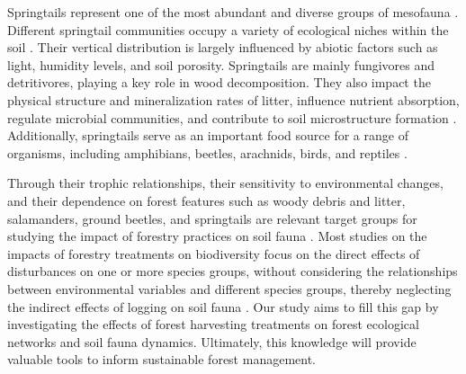 Springtails represent one of the most abundant and diverse groups of mesofauna \citep{rusekBiodiversityCollembolaTheir1998}. 
Different springtail communities occupy a variety of ecological niches within the soil \citep{pongeVerticalDistributionCollembola2000}. 
Their vertical distribution is largely influenced by abiotic factors such as light, humidity levels, and soil porosity. 
Springtails are mainly fungivores and detritivores, playing a key role in wood decomposition. 
They also impact the physical structure and mineralization rates of litter, influence nutrient absorption, 
regulate microbial communities, and contribute to soil microstructure formation \citep{Petersen1982comparativeanalysis,Neher2012Linkinginvertebrate,Maass2015Functionalrole,Potapov2016Connectingtaxonomy}. 
Additionally, springtails serve as an important food source for a range of organisms, including amphibians, beetles, arachnids, birds, and reptiles \citep{Burton1975Energyflow,Bauer1982Predationcarabid,rusekBiodiversityCollembolaTheir1998}.

Through their trophic relationships, their sensitivity to environmental changes, and their dependence on forest features such as woody debris and litter, 
salamanders, ground beetles, and springtails are relevant target groups for studying the impact of forestry practices on soil fauna \citep{Salmon2008Relationshipssoil}. 
Most studies on the impacts of forestry treatments on biodiversity focus on the direct effects of disturbances on one or more species groups, 
without considering the relationships between environmental variables and different species groups, thereby neglecting the indirect effects of logging on soil fauna \citep{josephIntegratingOccupancyModels2016,Pollierer2021Diversityfunctional,Kudrin2023metaanalysiseffects}. 
Our study aims to fill this gap by investigating the effects of forest harvesting treatments on forest ecological networks and soil fauna dynamics. 
Ultimately, this knowledge will provide valuable tools to inform sustainable forest management.

